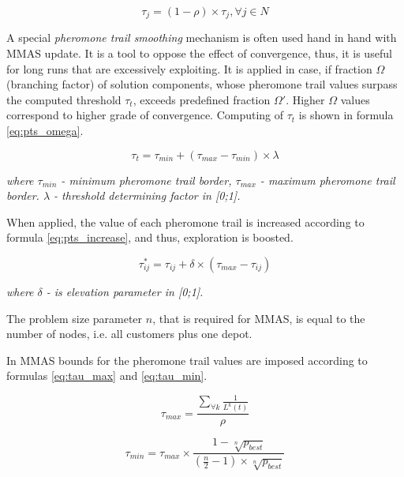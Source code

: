 \documentclass[11pt,a4paper,oneside]{book}
\begin{document}
\begin{enumerate}
\begin{equation}
\tau_j = (1-\rho) \times \tau_j, \forall j \in N
\label{eq:mmas_evaporation}
\end{equation}

A special \textit{pheromone trail smoothing} mechanism is often used hand in hand with MMAS update. It is a tool to oppose the effect of convergence, thus, it is useful for long runs that are excessively exploiting. It is applied in case, if fraction $\Omega$ (branching factor) of solution components, whose pheromone trail values surpass the computed threshold $\tau_t$, exceeds predefined fraction $\Omega'$. Higher $\Omega$ values correspond to higher grade of convergence. Computing of $\tau_t$ is shown in formula \eqref{eq:pts_omega}.

\begin{equation}
\tau_t = \tau_{min} + (\tau_{max} - \tau_{min}) \times \lambda
\label{eq:pts_omega}
\end{equation}

\textit{where $\tau_{min}$ - minimum pheromone trail border, $\tau_{max}$ - maximum pheromone trail border.  $\lambda$ - threshold determining factor in [0;1].}

When applied, the value of each pheromone trail is increased according to formula \eqref{eq:pts_increase}, and thus, exploration is boosted.

\begin{equation}
\tau^*_{ij} = \tau_{ij} + \delta \times (\tau_{max} - \tau_{ij})
\label{eq:pts_increase}
\end{equation}

\textit{where $\delta$ - is elevation parameter in [0;1].}

The problem size parameter $n$, that is required for MMAS, is equal to the number of nodes, i.e. all customers plus one depot.

In MMAS bounds for the pheromone trail values are imposed according to formulas \eqref{eq:tau_max} and \eqref{eq:tau_min}.

\begin{equation}
\tau_{max} = \frac{\sum \limits_{\forall k} \frac{1}{L^k(t)}}{\rho}
\label{eq:tau_max}
\end{equation}

\begin{equation}
\tau_{min} = \tau_{max} \times \frac{1-\sqrt[n]{p_{best}}}{(\frac{n}{2}-1) \times \sqrt[n]{p_{best}}}
\label{eq:tau_min}
\end{equation}


\end{enumerate}
\end{document}
